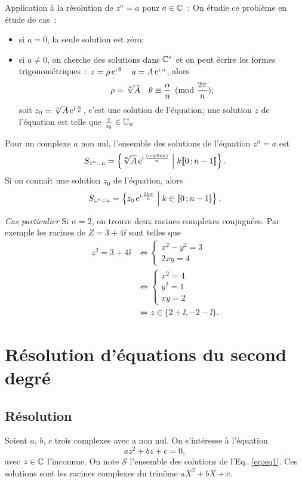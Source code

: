 Application à la résolution de $z^n=a$ pour $a \in \mathbb{C}$~: On étudie ce problème en étude de cas~:
\begin{itemize}
\item si $a=0$, la seule solution est zéro;
\item si $a \neq 0$, on cherche des solutions dans $\mathbb{C}^*$ et on peut écrire les formes trigonométriques~: $z=\rho \operatorname{e}^{\operatorname{i} \theta} \quad a = A \operatorname{e}^{\operatorname{i} \alpha}$, alors
  \begin{equation}
    \rho = \sqrt[n]{A} \quad \theta \equiv \frac{\alpha}{n} \pmod {\frac{2\pi}{n}};
  \end{equation}
  soit $z_0=\sqrt[n]{A}  \operatorname{e}^{\operatorname{i} \frac{\alpha}{n}}$, c'est une solution de l'équation; une solution $z$ de l'équation est telle que $\frac{z}{z_0} \in \mathbb{U}_n$
\end{itemize}
%
\begin{prop}
  Pour un complexe $a$ non nul, l'ensemble des solutions de l'équation $z^n=a$ est
  \begin{equation}
    S_{z^n=a}=\left\{\sqrt[n]{A} \operatorname{e}^{\operatorname{i} \frac{(\alpha + 2\pi k)}{n}}\mathrel{}\middle|\mathrel{}k \mathopen{\llbracket}0\mathclose{}\mathpunct{};n-1\mathclose{\rrbracket}\right\}.
  \end{equation}
  Si on connaît une solution $z_0$ de l'équation, alors
  \begin{equation}
    S_{z^n=a}=\left\{z_0 \operatorname{e}^{\operatorname{i} \frac{2 k \pi}{n}}\mathrel{}\middle|\mathrel{}k \in \mathopen{\llbracket}0\mathclose{}\mathpunct{};n-1\mathclose{\rrbracket}\right\}.
  \end{equation}
\end{prop}
\emph{Cas particulier}
Si $n=2$, on trouve deux racines complexes conjuguées. Par exemple les racines de $Z=3+4\ii$ sont telles que
\begin{align}
  z^2=3+4\ii & \iff  \begin{cases} x^2-y^2=3 \\ 2xy=4 \end{cases} \\
  & \iff \begin{cases} x^2=4 \\ y^2=1 \\ xy=2 \end{cases} \\
  & \iff z \in \{2+\ii, -2-\ii\}.
\end{align}
%
\section{Résolution d'équations du second degré}
\label{sec:resolutionequationseconddegre}
\subsection{Résolution}
\label{subsec:resolution}
Soient $a$, $b$, $c$ trois complexes avec a non nul. On s'intéresse à l'équation
\begin{equation}
  \label{eq:eq1}
  az^2+bz+c=0,
\end{equation}
avec $z \in \mathbb{C}$ l'inconnue. On note $\mathcal{S}$ l'ensemble des solutions de l'Eq.~\eqref{eq:eq1}. Ces solutions sont les racines complexes du trinôme $aX^2+bX+c$.

